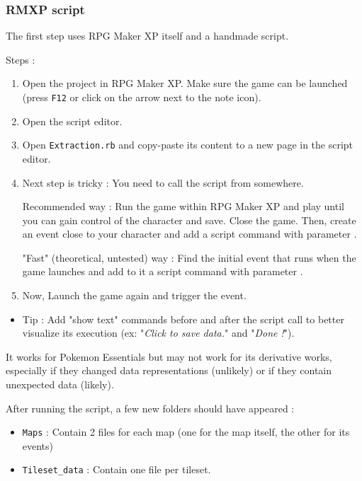 \documentclass[11pt]{article}
\begin{document}
\subsubsection{RMXP script}

The first step uses RPG Maker XP itself and a handmade script.

Steps :
\begin{enumerate}
	\item Open the project in RPG Maker XP. Make sure the game can be launched (press \verb|F12| or click on the arrow next to the note icon).
	
	\item Open the script editor.
	
	\item Open \verb|Extraction.rb| and copy-paste its content to a new page in the script editor.
	
	\item Next step is tricky : You need to call the script from somewhere. 
	
	Recommended way : Run the game within RPG Maker XP and play until you can gain control of the character and save. Close the game. Then, create an event close to your character and add a script command with parameter . 
	
	"Fast" (theoretical, untested) way : Find the initial event that runs when the game launches and add to it a script command with parameter .
	
	\item Now, Launch the game again and trigger the event.
\end{enumerate}

\begin{itemize}
	\item Tip : Add "show text" commands before and after the script call to better visualize its execution (ex: "\textit{Click to save data.}" and "\textit{Done !}").
\end{itemize}

It works for Pokemon Essentials but may not work for its derivative works, especially if they changed data representations (unlikely) or if they contain unexpected data (likely).

After running the script, a few new folders should have appeared :
\begin{itemize}
	\item \verb|Maps| : Contain 2 files for each map (one for the map itself, the other for its events)
	\item \verb|Tileset_data| : Contain one file per tileset.
\end{itemize}
\end{document}
